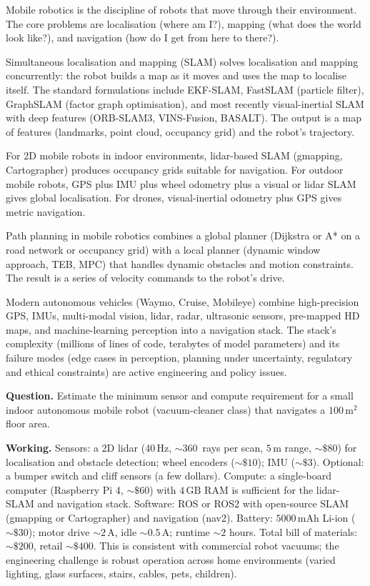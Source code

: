 Mobile robotics is the discipline of robots that move through their environment. The core problems are localisation (where am I?), mapping (what does the world look like?), and navigation (how do I get from here to there?).

Simultaneous localisation and mapping (SLAM) solves localisation and mapping concurrently: the robot builds a map as it moves and uses the map to localise itself. The standard formulations include EKF-SLAM, FastSLAM (particle filter), GraphSLAM (factor graph optimisation), and most recently visual-inertial SLAM with deep features (ORB-SLAM3, VINS-Fusion, BASALT). The output is a map of features (landmarks, point cloud, occupancy grid) and the robot's trajectory.

For 2D mobile robots in indoor environments, lidar-based SLAM (gmapping, Cartographer) produces occupancy grids suitable for navigation. For outdoor mobile robots, GPS plus IMU plus wheel odometry plus a visual or lidar SLAM gives global localisation. For drones, visual-inertial odometry plus GPS gives metric navigation.

Path planning in mobile robotics combines a global planner (Dijkstra or A* on a road network or occupancy grid) with a local planner (dynamic window approach, TEB, MPC) that handles dynamic obstacles and motion constraints. The result is a series of velocity commands to the robot's drive.

Modern autonomous vehicles (Waymo, Cruise, Mobileye) combine high-precision GPS, IMUs, multi-modal vision, lidar, radar, ultrasonic sensors, pre-mapped HD maps, and machine-learning perception into a navigation stack. The stack's complexity (millions of lines of code, terabytes of model parameters) and its failure modes (edge cases in perception, planning under uncertainty, regulatory and ethical constraints) are active engineering and policy issues.

\begin{estimation}
\textbf{Question.} Estimate the minimum sensor and compute requirement for a small indoor autonomous mobile robot (vacuum-cleaner class) that navigates a $100\,\text{m}^2$ floor area.

\textbf{Working.} Sensors: a 2D lidar (40$\,\text{Hz}$, $\sim 360\,$ rays per scan, $5\,\text{m}$ range, $\sim \$80$) for localisation and obstacle detection; wheel encoders ($\sim \$10$); IMU ($\sim \$3$). Optional: a bumper switch and cliff sensors (a few dollars). Compute: a single-board computer (Raspberry Pi 4, $\sim \$60$) with $4\,\text{GB}$ RAM is sufficient for the lidar-SLAM and navigation stack. Software: ROS or ROS2 with open-source SLAM (gmapping or Cartographer) and navigation (nav2). Battery: $5000\,\text{mAh}$ Li-ion ($\sim \$30$); motor drive $\sim 2\,\text{A}$, idle $\sim 0.5\,\text{A}$; runtime $\sim 2$ hours. Total bill of materials: $\sim \$200$, retail $\sim \$400$. This is consistent with commercial robot vacuums; the engineering challenge is robust operation across home environments (varied lighting, glass surfaces, stairs, cables, pets, children).
\end{estimation}

